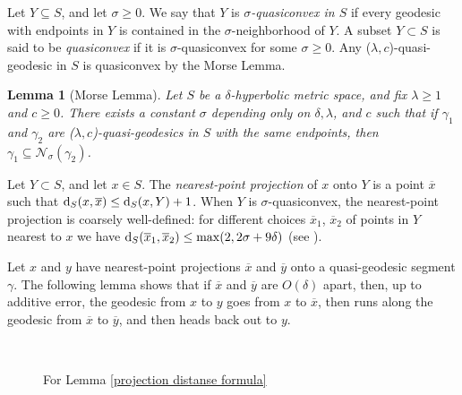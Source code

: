 \documentclass[11pt,letterpaper]{article}
\renewcommand{\d}{{\rm d}}
\renewcommand{\d}{{\rm d}}
\newtheorem{lem}[thm]{Lemma}
\theoremstyle{definition}
\theoremstyle{remark}
\begin{document}
Let $Y \subseteq S$, and let $\sigma \geq 0$. We say that $Y$ is {\it $\sigma$-quasiconvex in $S$} if every geodesic with endpoints in $Y$ is contained in the $\sigma$-neighborhood of $Y$. A subset $Y \subset S$ is said to be {\it quasiconvex} if it is $\sigma$-quasiconvex for some $\sigma \geq 0$. Any ($\lambda, c$)-quasi-geodesic in $S$ is quasiconvex by the Morse Lemma. 

\begin{lem} [Morse Lemma]\label{Morse lemma}
Let $S$ be a $\delta$-hyperbolic metric space, and fix $\lambda \geq 1$ and $c \geq 0$. There exists a constant $\sigma$ depending only on $\delta, \lambda$, and $c$ such that if $\gamma_1$ and $\gamma_2$ are ($\lambda, c$)-quasi-geodesics in $S$ with the same endpoints, then $\gamma_1 \subseteq \mathcal{N}_\sigma\left(\gamma_2\right)$.
\end{lem}

Let $Y \subset S$, and let $x \in S$. The {\it nearest-point projection} of $x$ onto $Y$ is a point $\overline{x}$ such that $\d_S(x, \overline{x}) \leq \d_S(x, Y)+1$. When $Y$ is $\sigma$-quasiconvex, the nearest-point projection is coarsely well-defined: for
different choices $\overline{x}_1$, $\overline{x}_2$ of points in $Y$ nearest to $x$ we have $\d_S(\overline{x}_1, \overline{x}_2) \leq \max(2, 2\sigma + 9\delta)$ (see \cite[Remark 1.103]{KS}).

Let $x$ and $y$ have nearest-point projections $\overline{x}$ and $\overline{y}$ onto a quasi-geodesic segment $\gamma$. The following lemma shows that if $\overline{x}$ and $\overline{y}$ are $O(\delta)$ apart, then, up to additive error, the geodesic from $x$ to $y$ goes from $x$ to $\overline{x}$, then runs along the geodesic from $\overline{x}$ to $\overline{y}$, and then heads back out to $y$.

\begin{figure}
\centering\\
  \caption{For Lemma \ref{projection distanse formula}}\label{sgp}
\end{figure}
\end{document}
